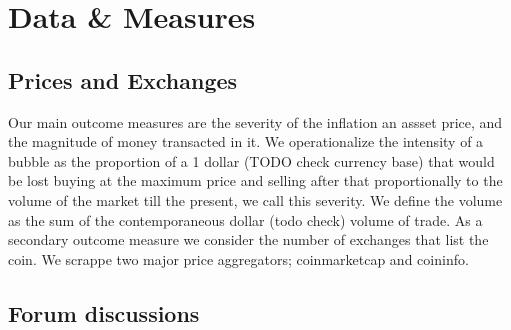 \section{Data \& Measures}



\subsection{Prices and Exchanges}

Our main outcome measures are the severity of the inflation an assset price, and the magnitude of money transacted in it.
We operationalize the  intensity of a bubble as the proportion of a 1 dollar (TODO check currency base) that would be lost buying at the maximum price and selling after that proportionally to the volume of the market till the present, we call this severity.
We define the volume as the sum of the contemporaneous dollar (todo check) volume of trade.
As a secondary outcome measure we consider the number of exchanges that list the coin.
We scrappe two major price aggregators; coinmarketcap and coininfo.


\subsection{Forum discussions}

